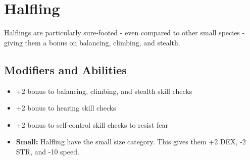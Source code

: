 \section{Halfling}\label{halfling}
Halflings are particularly sure-footed - even compared to other small species -
giving them a bonus on balancing, climbing, and stealth.

\subsection{Modifiers and Abilities}
\begin{itemize}
    \item +2 bonus to balancing, climbing, and stealth skill checks
    \item +2 bonus to hearing skill checks
    \item +2 bonus to self-control skill checks to resist fear
    \item \textbf{Small:} Halfling have the small size category. This gives
        them +2 DEX, -2 STR, and -10 speed.
\end{itemize}

